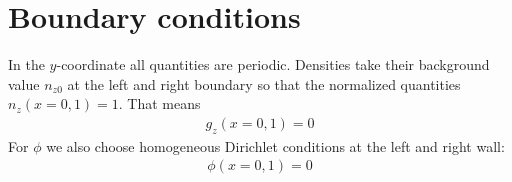 \documentclass[a4paper,12pt]{scrartcl}
\begin{document}
\section{Boundary conditions}
In the $y$-coordinate all quantities are periodic. 
Densities take their background value $n_{z0}$ at the left and
right boundary so that the normalized quantities $n_z(x=0,1) = 1$. 
That means
\begin{align}
    g_z( x=0, 1) = 0
    \label{}
\end{align}
For $\phi$ we also choose homogeneous Dirichlet conditions at the 
left and right wall:
\begin{align}
    \phi(x=0,1) = 0
    \label{}
\end{align}

\end{document}
